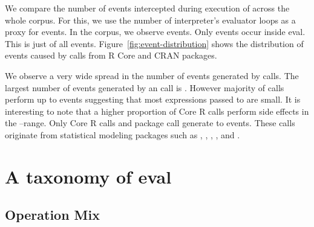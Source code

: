 \documentclass[conference]{IEEEtran}
\begin{document}
We compare the number of events intercepted during execution of \eval across the
whole corpus. For this, we use the number of interpreter's evaluator loops as a
proxy for events. In the corpus, we observe \AllEventCountRnd events. Only
\EvalEventCountRnd events occur inside eval. This is just \EvalEventAllPerc of
all events. Figure~\ref{fig:event-distribution} shows the distribution of events
caused by \eval calls from R Core and CRAN packages.

\begin{table}[ht] \label{table:event-distribution}
\caption{Distribution of events in \eval calls across Core and Package}
\end{table}

We observe a very wide spread in the number of events generated by \eval
calls. The largest number of events generated by an \eval call is \EventsMaxCount.
However majority of \eval calls perform up to \EventsMaxRangeA events suggesting
that most expressions passed to \eval are small.
It is interesting to note that a higher proportion of Core R \eval calls perform
side effects in the \EventsMinRangeB--\EventsMaxRangeB range.
Only \EventsCoreEvalCountC Core R \eval calls and \EventsPackageEvalCountC
package \eval call generate \EventsMinRangeC to \EventsMaxRangeC events.
These \eval calls originate from statistical modeling packages such as \mlogit,
\mboost, \metafor, \lavaan, \mclust and \gamlss.

\section{A taxonomy of eval}



\subsection{Operation Mix}
\end{document}
